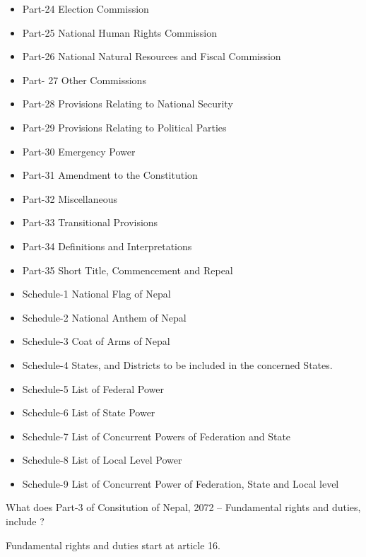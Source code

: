 \begin{questions}
\begin{solution}
\begin{itemize}
  \item Part-24 Election Commission
  \item Part-25 National Human Rights Commission
  \item Part-26 National Natural Resources and Fiscal Commission
  \item Part- 27 Other Commissions
  \item Part-28 Provisions Relating to National Security
  \item Part-29 Provisions Relating to Political Parties
  \item Part-30 Emergency Power
  \item Part-31 Amendment to the Constitution
  \item Part-32 Miscellaneous
  \item Part-33 Transitional Provisions
  \item Part-34 Definitions and Interpretations
  \item Part-35 Short Title, Commencement and Repeal
  \item Schedule-1 National Flag of Nepal
  \item Schedule-2 National Anthem of Nepal
  \item Schedule-3 Coat of Arms of Nepal
  \item Schedule-4 States, and Districts to be included in the concerned States.
  \item Schedule-5 List of Federal Power
  \item Schedule-6 List of State Power
  \item Schedule-7 List of Concurrent Powers of Federation and State
  \item Schedule-8 List of Local Level Power
  \item Schedule-9 List of Concurrent Power of Federation, State and Local level
  \end{itemize}
  \end{solution}

\question What does Part-3 of Consitution of Nepal, 2072 -- Fundamental rights and duties, include ?
  \begin{solution}
  
  Fundamental rights and duties start at article 16. 
  

\end{solution}
\end{questions}
